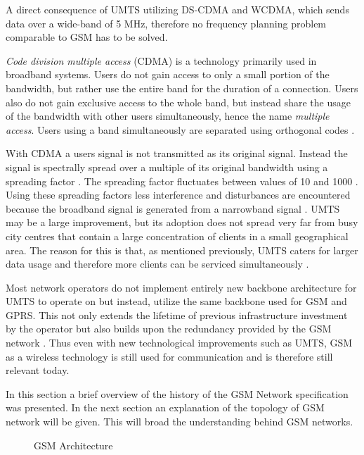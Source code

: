 A direct consequence of UMTS utilizing DS-CDMA and WCDMA, which sends data over a wide-band of 5 MHz, therefore no frequency planning problem comparable to GSM has to be solved\cite{tabuglobalplanning3g,Eisenblatter}. 

\emph{Code division multiple access} (CDMA) is a technology primarily used in broadband systems. Users do not gain access to only a small portion of the bandwidth, but rather use the entire band for the duration of a connection. Users also do not gain exclusive access to the whole band, but instead share the usage of the bandwidth with other users simultaneously, hence the name \emph{multiple access}. Users using a band simultaneously are separated using orthogonal codes \cite{GSMArchitectureProtocolsServices}.

With CDMA a users signal is not transmitted as its original signal. Instead the signal is spectrally spread over a multiple of its original bandwidth using a spreading factor \cite{GSMArchitectureProtocolsServices}. The spreading factor fluctuates between values of 10 and 1000 \cite{GSMArchitectureProtocolsServices}. Using these spreading factors less interference and disturbances are encountered because the broadband signal is generated from a narrowband signal \cite{GSMArchitectureProtocolsServices}.
UMTS may be a large improvement, but its adoption does not spread very far from busy city centres that contain a large concentration of clients in a small geographical area. The reason for this is that, as mentioned previously, UMTS caters for larger data usage and therefore more clients can be serviced simultaneously \cite{GSMArchitectureProtocolsServices}.

Most network operators do not implement entirely new backbone architecture for UMTS\label{UMTSGSMBackbone} to operate on but instead, utilize the same backbone used for GSM and GPRS. This not only extends the lifetime of previous infrastructure investment by the operator but also builds upon the redundancy provided by the GSM network \cite{GSMArchitectureProtocolsServices}. Thus even with new technological improvements such as UMTS, GSM as a wireless technology is still used for communication and is therefore still relevant today.

In this section a brief overview of the history of the GSM Network specification was presented. In the next section an explanation of the topology of GSM network will be given. This will broad the understanding behind GSM networks.

\begin{figure}[hptb]
	\begin{centering}
		
		\caption{GSM Architecture}
		\label{fig:GSMArchitecture}
	\end{centering}
\end{figure}

